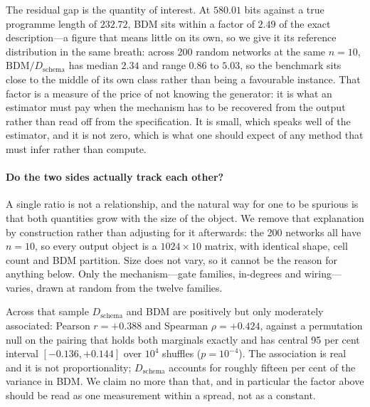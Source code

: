 \documentclass[11pt]{article}
\begin{document}
The residual gap is the quantity of interest.  At $580.01$ bits against a true
programme length of $232.72$, BDM sits within a factor of $2.49$ of the exact
description---a figure that means little on its own, so we give it its reference
distribution in the same breath: across 200 random networks at the same $n=10$,
$\mathrm{BDM}/D_{\mathrm{schema}}$ has median $2.34$ and range $0.86$ to $5.03$,
so the benchmark sits close to the middle of its own class rather than being a
favourable instance.  That factor is a measure of the price of not knowing the
generator: it is what an estimator must pay when the mechanism has to be
recovered from the output rather than read off from the specification.  It is
small, which speaks well of the estimator, and it is not zero, which is what one
should expect of any method that must infer rather than compute.

\paragraph{Do the two sides actually track each other?}
A single ratio is not a relationship, and the natural way for one to be
spurious is that both quantities grow with the size of the object.  We remove
that explanation by construction rather than adjusting for it afterwards: the
200 networks all have $n=10$, so every output object is a $1024\times 10$
matrix, with identical shape, cell count and BDM partition.  Size does not vary,
so it cannot be the reason for anything below.  Only the mechanism---gate
families, in-degrees and wiring---varies, drawn at random from the twelve
families.

Across that sample $D_{\mathrm{schema}}$ and BDM are positively but only
moderately associated: Pearson $r=+0.388$ and Spearman $\rho=+0.424$, against a
permutation null on the pairing that holds both marginals exactly and has
central 95 per cent interval $[-0.136,+0.144]$ over $10^4$ shuffles
($p=10^{-4}$).  The association is real and it is not proportionality;
$D_{\mathrm{schema}}$ accounts for roughly fifteen per cent of the variance in
BDM.  We claim no more than that, and in particular the factor above should be
read as one measurement within a spread, not as a constant.
\end{document}
